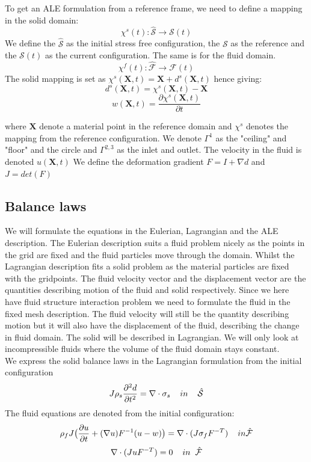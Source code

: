 To get an ALE formulation from a reference frame, we need to define a mapping in the solid domain:
$$  \chi^s(t) : \hat{\mathcal{S}} \rightarrow \mathcal{S}(t)     $$ 
We define the $ \hat{\mathcal{S}}$ as the initial stress free configuration, the $\mathcal{S}$ as the reference and the $\mathcal{S}(t)$ as the current configuration.
The same is for the fluid domain.
$$  \chi^f(t) : \hat{\mathcal{F}} \rightarrow \mathcal{F}(t)     $$ 
The solid mapping is set as $\chi^s(\textbf{X},t) = \textbf{X}  + d^s(\textbf{X} ,t)$
hence giving:
$$  d^s(\textbf{X},t) = \chi^s(\textbf{X},t) -\textbf{X}   $$
$$  w(\textbf{X},t) = \frac{\partial \chi^s(\textbf{X},t)}{\partial t}   $$

where $\textbf{X}$ denote a material point in the reference domain and $\chi^s$ denotes the mapping from the reference configuration.
We denote $\Gamma^1$ as the "ceiling" and "floor" and the circle and $\Gamma^{2,3}$ as the inlet and outlet.
The velocity in the fluid is denoted $u(\textbf{X},t)$
We define the deformation gradient $F = I + \nabla d$ and $J = det(F)$
\subsection*{Balance laws}
We will formulate the equations in the Eulerian, Lagrangian and the ALE description.
The Eulerian description suits a fluid problem nicely as the points in the grid are fixed and the fluid particles move through the domain. Whilst the Lagrangian description fits a solid problem as the material particles are fixed with the gridpoints. The fluid velocity vector and the displacement vector are the quantities describing motion of the fluid and solid respectively. Since we here have fluid structure interaction problem we need to formulate the fluid in the fixed mesh description. The fluid velocity will still be the quantity describing motion but it will also have the displacement of the fluid, describing the change in fluid domain. The solid will be described in Lagrangian. We will only look at incompressible fluids where the volume of the fluid domain stays constant.\\
We express the solid balance laws in the Lagrangian formulation from the initial configuration
$$J\rho_s \frac{\partial^2 d}{\partial t^2} = \nabla \cdot \sigma_s \hspace{4mm}in\hspace{4mm} \mathcal{\hat{S}} $$
The fluid equations are denoted from the initial configuration:
$$ \rho_f J \big( \frac{\partial u}{\partial t} + (\nabla u)F^{-1}(u-w)\big) = \nabla \cdot (J\sigma_f F^{-T} )\hspace{4mm} in \mathcal{\hat{F}}$$
$$ \nabla \cdot (J u F^{-T}) = 0 \hspace{4mm} in \hspace{2mm} \mathcal{\hat{F}}$$

